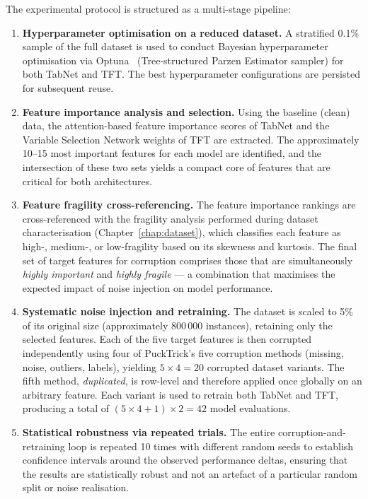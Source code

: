 The experimental protocol is structured as a multi-stage pipeline:

\begin{enumerate}
    \item \textbf{Hyperparameter optimisation on a reduced dataset.}
          A stratified 0.1\% sample of the full dataset is used to conduct
          Bayesian hyperparameter optimisation via Optuna~\cite{akiba2019optuna}
          (Tree-structured Parzen Estimator sampler) for both TabNet and TFT.
          The best hyperparameter configurations are persisted for subsequent
          reuse.
    \item \textbf{Feature importance analysis and selection.}
          Using the baseline (clean) data, the attention-based feature importance
          scores of TabNet and the Variable Selection Network weights of TFT
          are extracted.  The approximately 10--15 most important features for
          each model are identified, and the intersection of these two sets
          yields a compact core of features that are critical for both
          architectures.
    \item \textbf{Feature fragility cross-referencing.}
          The feature importance rankings are cross-referenced with the
          fragility analysis performed during dataset characterisation
          (Chapter~\ref{chap:dataset}), which classifies each feature as high-,
          medium-, or low-fragility based on its skewness and kurtosis.  The
          final set of target features for corruption comprises those that are
          simultaneously \emph{highly important} and \emph{highly fragile} — a
          combination that maximises the expected impact of noise injection on
          model performance.
    \item \textbf{Systematic noise injection and retraining.}
          The dataset is scaled to 5\% of its original size (approximately
          800\,000 instances), retaining only the selected features.  Each of
          the five target features is then corrupted independently using four
          of PuckTrick's five corruption methods (missing, noise, outliers,
          labels), yielding $5 \times 4 = 20$ corrupted dataset variants.  The
          fifth method, \emph{duplicated}, is row-level and therefore applied
          once globally on an arbitrary feature.  Each variant is used to
          retrain both TabNet and TFT, producing a total of
          $(5 \times 4 + 1) \times 2 = 42$ model evaluations.
    \item \textbf{Statistical robustness via repeated trials.}
          The entire corruption-and-retraining loop is repeated 10 times with
          different random seeds to establish confidence intervals around the
          observed performance deltas, ensuring that the results are
          statistically robust and not an artefact of a particular random
          split or noise realisation.
\end{enumerate}

